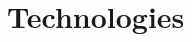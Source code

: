 \documentclass[a4paper, notitlepage]{report}
\begin{document}
\chapter{Technologies}

%
%
%
%
%
%
%
%
%
%
%
%
%
%
%
%
%
%
\end{document}
